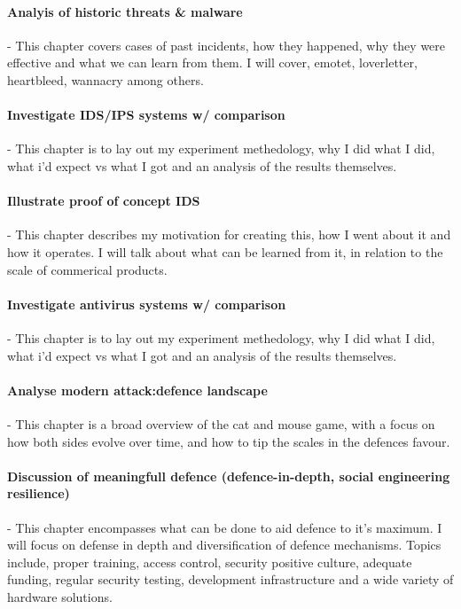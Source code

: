 \paragraph{Analyis of historic threats & malware} - This chapter covers cases of past incidents, how they happened, why they were effective and what we can learn from them.
I will cover, emotet, loverletter, heartbleed, wannacry among others.

\paragraph{Investigate IDS/IPS systems w/ comparison} - This chapter is to lay out my experiment methedology, why I did what I did, what i'd expect vs what I got and an analysis of the results themselves.

\paragraph{Illustrate proof of concept IDS} - This chapter describes my motivation for creating this, how I went about it and how it operates. I will talk about what can be learned from it, in relation to the scale of commerical products.

\paragraph{Investigate antivirus systems w/ comparison} - This chapter is to lay out my experiment methedology, why I did what I did, what i'd expect vs what I got and an analysis of the results themselves.

\paragraph{Analyse modern attack:defence landscape} - This chapter is a broad overview of the cat and mouse game, with a focus on how both sides evolve over time, and how to tip the scales in the defences favour.

\paragraph{Discussion of meaningfull defence (defence-in-depth, social engineering resilience)} - This chapter encompasses what can be done to aid defence to it's maximum. I will focus on defense in depth and diversification of defence mechanisms. 
Topics include, proper training, access control, security positive culture, adequate funding, regular security testing, development infrastructure and a wide variety of hardware solutions.

